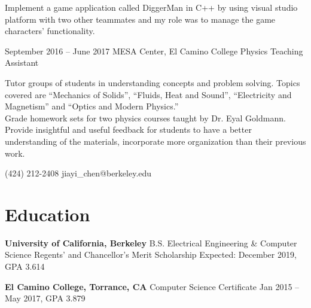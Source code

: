 \documentclass{tccv}
\begin{document}
\begin{eventlist}
Implement a game application called DiggerMan in C++ by using visual studio platform with two other teammates and my role was to manage the game characters’ functionality.

\item{September 2016 -- June 2017}
     {MESA Center, El Camino College}
     {Physics Teaching Assistant}

Tutor groups of students in understanding concepts and problem solving. Topics covered are “Mechanics of Solids”, “Fluids, Heat and Sound”, “Electricity and Magnetism” and “Optics and Modern Physics.”\smallskip\\

Grade homework sets for two physics courses taught by Dr. Eyal Goldmann. Provide insightful and useful feedback for students to have a better understanding of the materials, incorporate more organization than their previous work.

\end{eventlist}

\personal
    {(424) 212-2408}
    {jiayi\_chen@berkeley.edu}

\section{Education}
     


\item\fontsize{12pt}\selectfont\textbf{University of California, Berkeley}
     {\smallskip\newline B.S. Electrical Engineering \& Computer Science}
     {\smallskip\newline Regents' and Chancellor's Merit Scholarship}
     {\smallskip\newline Expected: December 2019, GPA 3.614}
     
\item\fontsize{12pt}\selectfont\textbf{El Camino College, Torrance, CA}
     {\smallskip\newline Computer Science Certificate}
     {\smallskip\newline Jan 2015 -- May 2017, GPA 3.879}
\end{document}
